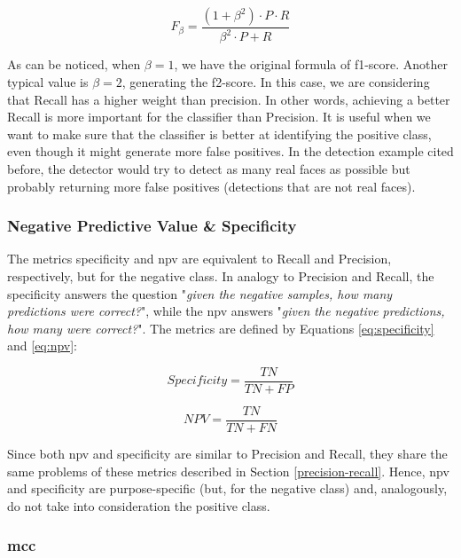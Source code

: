\begin{equation}
\label{eq:f-beta}
F_\beta = \frac{(1 + \beta^2) \cdot P \cdot R}{\beta^2 \cdot P + R}
\end{equation}

As can be noticed, when $\beta=1$, we have the original formula of f1-score. Another typical value is $\beta=2$, generating the f2-score. In this case, we are considering that Recall has a higher weight than precision. In other words, achieving a better Recall is more important for the classifier than Precision. It is useful when we want to make sure that the classifier is better at identifying the positive class, even though it might generate more false positives. In the detection example cited before, the detector would try to detect as many real faces as possible but probably returning more false positives (detections that are not real faces).

\subsubsection{Negative Predictive Value \& Specificity}

The metrics specificity and \acf{npv} are equivalent to Recall and Precision, respectively, but for the negative class. In analogy to Precision and Recall, the specificity answers the question "\textit{given the negative samples, how many predictions were correct?}", while the \acs{npv} answers "\textit{given the negative predictions, how many were correct?}". The metrics are defined by Equations \ref{eq:specificity} and \ref{eq:npv}:

\begin{equation}
\label{eq:specificity}
Specificity = \frac{TN}{TN + FP}
\end{equation}

\begin{equation}
\label{eq:npv}
NPV = \frac{TN}{TN + FN}
\end{equation}

Since both \acs{npv} and specificity are similar to Precision and Recall, they share the same problems of these metrics described in Section \ref{precision-recall}. Hence, \acs{npv} and specificity are purpose-specific (but, for the negative class) and, analogously, do not take into consideration the positive class.

\subsubsection{\acl{mcc}} \label{sec:mcc}

